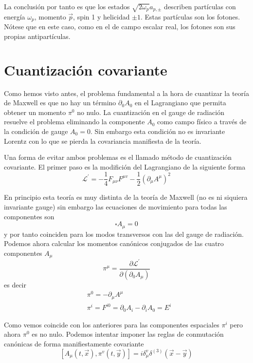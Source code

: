 La conclusión por tanto es que los estados $\sqrt{2 \omega_{p}} a_{p, \pm}$ describen partículas con energía $\omega_{p}$, momento $\vec{p}$, spin 1 y helicidad $\pm 1$. Estas partículas son los fotones. Nótese que en este caso, como en el de campo escalar real, los fotones son sus propias antipartículas.
\section{Cuantización covariante}

Como hemos visto antes, el problema fundamental a la hora de cuantizar la teoría de Maxwell es que no hay un término $\partial_{0} A_{0}$ en el Lagrangiano que permita obtener un momento $\pi^{0}$ no nulo. La cuantización en el gauge de radiación resuelve el problema eliminando la componente $A_{0}$ como campo físico a través de la condición de gauge $A_{0}=0$. Sin embargo esta condición no es invariante Lorentz con lo que se pierda la covariancia manifiesta de la teoría.

Una forma de evitar ambos problemas es el llamado método de cuantización covariante. El primer paso es la modifición del Lagrangiano de la siguiente forma
\begin{equation*}
\mathscr{L}^{\prime}=-\frac{1}{4} F_{\mu \nu} F^{\mu v}-\frac{1}{2}\left(\partial_{\mu} A^{\mu}\right)^{2} \tag{6.48}
\end{equation*}

En principio esta teoría es muy distinta de la teoría de Maxwell (no es ni siquiera invariante gauge) sin embargo las ecuaciones de movimiento para todas las componentes son
\begin{equation*}
\square A_{\mu}=0 \tag{6.49}
\end{equation*}
y por tanto coinciden para los modos transversos con las del gauge de radiación.
Podemos ahora calcular los momentos canónicos conjugados de las cuatro componentes $A_{\mu}$
\begin{equation*}
\pi^{\mu}=\frac{\partial \mathscr{L}^{\prime}}{\partial\left(\partial_{0} A_{\mu}\right)} \tag{6.50}
\end{equation*}
es decir
$$
\begin{align*}
& \pi^{0}=-\partial_{\mu} A^{\mu} \\
& \pi^{i}=F^{i 0}=\partial_{0} A_{i}-\partial_{i} A_{0}=E^{i} \tag{6.51}
\end{align*}
$$

Como vemos coincide con los anteriores para las componentes espaciales $\pi^{i}$ pero ahora $\pi^{0}$ es no nulo. Podemos intentar imponer las reglas de conmutación canónicas de forma manifiestamente covariante
\begin{equation*}
\left[A_{\mu}(t, \vec{x}), \pi^{v}(t, \vec{y})\right]=i \delta_{\mu}^{v} \delta^{(3)}(\vec{x}-\vec{y}) \tag{6.52}
\end{equation*}

